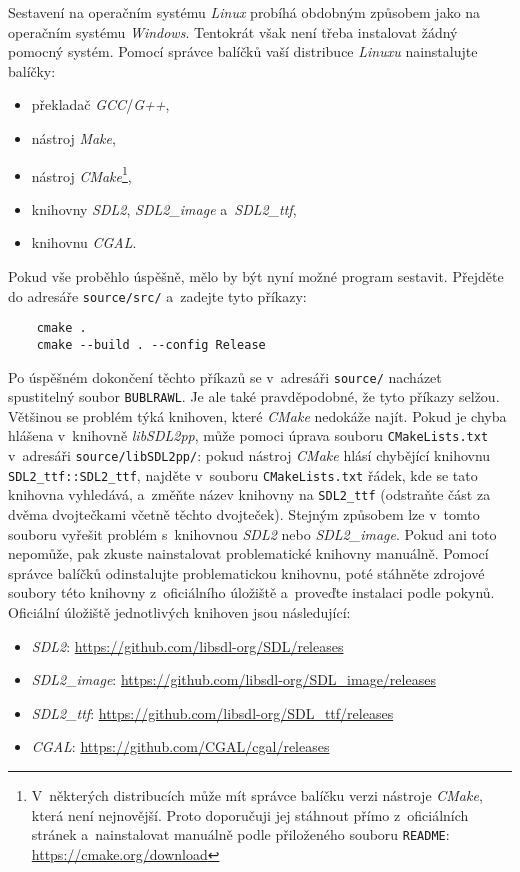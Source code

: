Sestavení na operačním systému \emph{Linux} probíhá obdobným způsobem jako na operačním systému \emph{Windows}. Tentokrát však není třeba instalovat žádný pomocný systém. Pomocí správce balíčků vaší distribuce \emph{Linuxu} nainstalujte balíčky:
\begin{itemize}
    \item překladač \emph{GCC}/\emph{G++},
    \item nástroj \emph{Make},
    \item nástroj \emph{CMake}\footnote{V~některých distribucích může mít správce balíčku verzi nástroje \emph{CMake}, která není nejnovější. Proto doporučuji jej stáhnout přímo z~oficiálních stránek a~nainstalovat manuálně podle přiloženého souboru \texttt{README}: \url{https://cmake.org/download}},
    \item knihovny \emph{SDL2}, \emph{SDL2\_image} a~\emph{SDL2\_ttf},
    \item knihovnu \emph{CGAL}.
\end{itemize}

Pokud vše proběhlo úspěšně, mělo by být nyní možné program sestavit. Přejděte do adresáře \texttt{source/src/} a~zadejte tyto příkazy:
\begin{verbatim}
    cmake .
    cmake --build . --config Release
\end{verbatim}
Po úspěšném dokončení těchto příkazů se v~adresáři \texttt{source/} nacházet spustitelný soubor \texttt{BUBLRAWL}. Je ale také pravděpodobné, že tyto příkazy selžou. Většinou se problém týká knihoven, které \emph{CMake} nedokáže najít. Pokud je chyba hlášena v~knihovně \emph{libSDL2pp}, může pomoci úprava souboru \texttt{CMakeLists.txt} v~adresáři \texttt{source/libSDL2pp/}: pokud nástroj \emph{CMake} hlásí chybějící knihovnu \verb|SDL2_ttf::SDL2_ttf|, najděte v~souboru \texttt{CMakeLists.txt} řádek, kde se tato knihovna vyhledává, a~změňte název knihovny na \verb|SDL2_ttf| (odstraňte část za dvěma dvojtečkami včetně těchto dvojteček). Stejným způsobem lze v~tomto souboru vyřešit problém s~knihovnou \emph{SDL2} nebo \emph{SDL2\_image}. Pokud ani toto nepomůže, pak zkuste nainstalovat problematické knihovny manuálně. Pomocí správce balíčků odinstalujte problematickou knihovnu, poté stáhněte zdrojové soubory této knihovny z~oficiálního úložiště a~proveďte instalaci podle pokynů. Oficiální úložiště jednotlivých knihoven jsou následující:
\begin{itemize}
    \item \emph{SDL2}: \url{https://github.com/libsdl-org/SDL/releases}
    \item \emph{SDL2\_image}: \url{https://github.com/libsdl-org/SDL_image/releases}
    \item \emph{SDL2\_ttf}: \url{https://github.com/libsdl-org/SDL_ttf/releases}
    \item \emph{CGAL}: \url{https://github.com/CGAL/cgal/releases}
\end{itemize}



